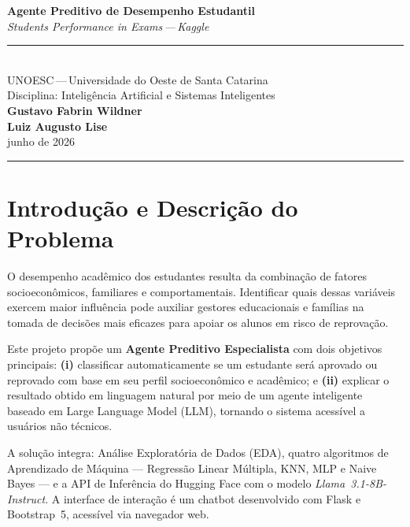 \documentclass[12pt, a4paper]{article}
\begin{document}
\begin{center}
  \vspace*{0.3cm}
  {\LARGE\bfseries Agente Preditivo de Desempenho Estudantil}\\[0.8em]
  {\large\itshape Students Performance in Exams\,---\,Kaggle}\\[0.5em]
  \rule{0.55\textwidth}{0.4pt}\\[0.7em]
  {\normalsize UNOESC\,---\,Universidade do Oeste de Santa Catarina}\\[0.2em]
  {\normalsize Disciplina: Inteligência Artificial e Sistemas Inteligentes}\\[0.8em]
  {\normalsize\bfseries Gustavo Fabrin Wildner}\\[0.2em]
  {\normalsize\bfseries Luiz Augusto Lise}\\[0.6em]
  {\normalsize junho de 2026}
\end{center}

\medskip\hrule\bigskip

\tableofcontents
\newpage

\section{Introdução e Descrição do Problema}

O desempenho acadêmico dos estudantes resulta da combinação de fatores
socioeconômicos, familiares e comportamentais. Identificar quais dessas
variáveis exercem maior influência pode auxiliar gestores educacionais e
famílias na tomada de decisões mais eficazes para apoiar os alunos em risco
de reprovação.

Este projeto propõe um \textbf{Agente Preditivo Especialista} com dois
objetivos principais: \textbf{(i)} classificar automaticamente se um
estudante será aprovado ou reprovado com base em seu perfil socioeconômico e
acadêmico; e \textbf{(ii)} explicar o resultado obtido em linguagem natural
por meio de um agente inteligente baseado em Large Language Model (LLM),
tornando o sistema acessível a usuários não técnicos.

A solução integra: Análise Exploratória de Dados (EDA), quatro algoritmos de
Aprendizado de Máquina --- Regressão Linear Múltipla, KNN, MLP e Naive Bayes
--- e a API de Inferência do Hugging Face com o modelo
\textit{Llama~3.1-8B-Instruct}. A interface de interação é um chatbot desenvolvido com Flask e Bootstrap~5,
acessível via navegador web.
\end{document}
